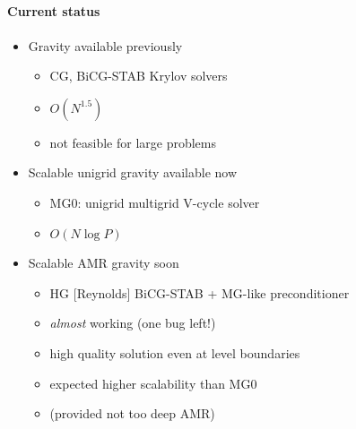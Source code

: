\NEWSEC


\subsection{\ssRecentGravity}



%  
%
\begin{frame}[fragile,label=ss-recent-gravity] 
\secframetitle{\ssRecentGravity}
\framesubtitle{Current status}
\begin{itemize}
   \item Gravity available previously
\begin{itemize}
   \item        CG, BiCG-STAB Krylov solvers
 \item       $O(N^{1.5})$
\item       not feasible for large problems
\end{itemize}
   \item Scalable unigrid gravity available now
\begin{itemize}
   \item        MG0: unigrid multigrid V-cycle solver
\item         $O(N \log P)$
\end{itemize}
   \item  Scalable AMR gravity soon
\begin{itemize}
\item HG [Reynolds] BiCG-STAB + MG-like preconditioner
\item         \textit{almost} working (one bug left!)
\item          high quality solution even at level boundaries
\item         expected higher scalability than MG0
\item          (provided not too deep AMR)
\end{itemize}
\end{itemize}
\end{frame}
%
%
